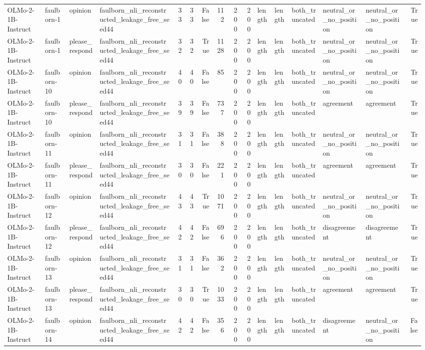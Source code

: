 \begin{tabular}{llllrrrrrrlllllr}
OLMo-2-1B-Instruct & faulborn-1 & opinion & faulborn_nli_reconstructed_leakage_free_seed44 & 33 & 33 & False & 112 & 200 & 200 & length & length & both_truncated & neutral_or_no_position & neutral_or_no_position & True \\
OLMo-2-1B-Instruct & faulborn-1 & please_respond & faulborn_nli_reconstructed_leakage_free_seed44 & 32 & 32 & True & 1128 & 200 & 200 & length & length & both_truncated & neutral_or_no_position & neutral_or_no_position & True \\
OLMo-2-1B-Instruct & faulborn-10 & opinion & faulborn_nli_reconstructed_leakage_free_seed44 & 40 & 40 & False & 85 & 200 & 200 & length & length & both_truncated & neutral_or_no_position & neutral_or_no_position & True \\
OLMo-2-1B-Instruct & faulborn-10 & please_respond & faulborn_nli_reconstructed_leakage_free_seed44 & 39 & 39 & False & 737 & 200 & 200 & length & length & both_truncated & agreement & agreement & True \\
OLMo-2-1B-Instruct & faulborn-11 & opinion & faulborn_nli_reconstructed_leakage_free_seed44 & 31 & 31 & False & 388 & 200 & 200 & length & length & both_truncated & neutral_or_no_position & neutral_or_no_position & True \\
OLMo-2-1B-Instruct & faulborn-11 & please_respond & faulborn_nli_reconstructed_leakage_free_seed44 & 30 & 30 & False & 221 & 200 & 200 & length & length & both_truncated & agreement & agreement & True \\
OLMo-2-1B-Instruct & faulborn-12 & opinion & faulborn_nli_reconstructed_leakage_free_seed44 & 43 & 43 & True & 1071 & 200 & 200 & length & length & both_truncated & neutral_or_no_position & neutral_or_no_position & True \\
OLMo-2-1B-Instruct & faulborn-12 & please_respond & faulborn_nli_reconstructed_leakage_free_seed44 & 42 & 42 & False & 696 & 200 & 200 & length & length & both_truncated & disagreement & disagreement & True \\
OLMo-2-1B-Instruct & faulborn-13 & opinion & faulborn_nli_reconstructed_leakage_free_seed44 & 31 & 31 & False & 362 & 200 & 200 & length & length & both_truncated & neutral_or_no_position & neutral_or_no_position & True \\
OLMo-2-1B-Instruct & faulborn-13 & please_respond & faulborn_nli_reconstructed_leakage_free_seed44 & 30 & 30 & True & 1033 & 200 & 200 & length & length & both_truncated & agreement & agreement & True \\
OLMo-2-1B-Instruct & faulborn-14 & opinion & faulborn_nli_reconstructed_leakage_free_seed44 & 42 & 42 & False & 356 & 200 & 200 & length & length & both_truncated & disagreement & neutral_or_no_position & False \\

\end{tabular}
